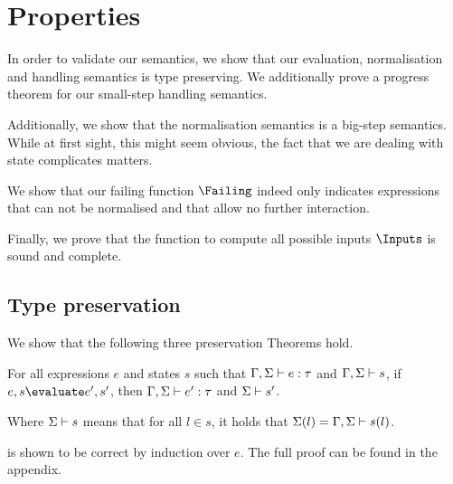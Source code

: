 


\section{Properties}
\label{sec:properties}




In order to validate our semantics, we show that our evaluation, normalisation
and handling semantics is type preserving. We additionally prove a progress
theorem for our small-step handling semantics.

Additionally, we show that the normalisation semantics is a big-step semantics. 
While at first sight, this might seem obvious, the fact that we are dealing with
state complicates matters.

We show that our failing function $\Failing$ indeed only indicates expressions
that can not be normalised and that allow no further interaction.

Finally, we prove that the function to compute all possible inputs $\Inputs$ is sound and complete.



\subsection{Type preservation}
\label{sub:preservation}

We show that the following three preservation Theorems hold.

\begin{theorem}
  For all expressions $e$ and states $s$
  such that $\Gamma,\Sigma \vdash e:\tau$ and $\Gamma,\Sigma \vdash s$,
  if $e,s \evaluate e',s'$,
  then $\Gamma,\Sigma \vdash e':\tau$ and $\Sigma \vdash s'$.
  \label{thm:pres-eval}
\end{theorem}

Where $\Sigma \vdash s$ means that for all $l\in s$, it holds that
$\Sigma(l)=\Gamma,\Sigma\vdash s(l)$.

 is shown to be correct by induction over $e$. The full
proof can be found in the appendix.


